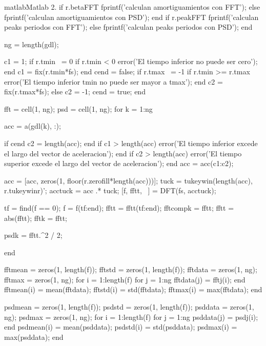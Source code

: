 \begin{sourcecode}{matlab}{Matlab 2.}
if r.betaFFT
    fprintf('\tSe calculan amortiguamientos con FFT\n');
else
    fprintf('\tSe calculan amortiguamientos con PSD\n');
end
if r.peakFFT
    fprintf('\tSe calculan peaks periodos con FFT\n');
else
    fprintf('\tSe calculan peaks periodos con PSD\n');
end

ng = length(gdl);

c1 = 1;
if r.tmin ~= 0
    if r.tmin < 0
        error('El tiempo inferior no puede ser cero');
    end
    c1 = fix(r.tmin*fs);
end
cend = false;
if r.tmax ~= -1
    if r.tmin >= r.tmax
        error('El tiempo inferior tmin no puede ser mayor a tmax');
    end
    c2 = fix(r.tmax*fs);
else
    c2 = -1;
    cend = true;
end

fft = cell(1, ng);
psd = cell(1, ng);
for k = 1:ng
    
    acc = a(gdl(k), :);
    
    if cend
        c2 = length(acc);
    end
    if c1 > length(acc)
        error('El tiempo inferior excede el largo del vector de aceleracion');
    end
    if c2 > length(acc)
        error('El tiempo superior excede el largo del vector de aceleracion');
    end
    acc = acc(c1:c2);
    
    acc = [acc, zeros(1, floor(r.zerofill*length(acc)))]; %
    tuck = tukeywin(length(acc), r.tukeywinr)';
    acctuck = acc .* tuck;
    [f, fftt, ~] = DFT(fs, acctuck);
    
    tf = find(f == 0);
    f = f(tf:end);
    fftt = fftt(tf:end);
    fftcomp{k} = fftt; %
    fftt = abs(fftt); %
    fft{k} = fftt; %
    
    psd{k} = fftt.^2 / 2;
    
end %

fftmean = zeros(1, length(f));
fftstd = zeros(1, length(f));
fftdata = zeros(1, ng);
fftmax = zeros(1, ng);
for i = 1:length(f)
    for j = 1:ng %
        fftdata(j) = fft{j}(i);
    end %
    fftmean(i) = mean(fftdata);
    fftstd(i) = std(fftdata);
    fftmax(i) = max(fftdata);
end %

psdmean = zeros(1, length(f));
psdstd = zeros(1, length(f));
psddata = zeros(1, ng);
psdmax = zeros(1, ng);
for i = 1:length(f)
    for j = 1:ng %
        psddata(j) = psd{j}(i);
    end %
    psdmean(i) = mean(psddata);
    psdstd(i) = std(psddata);
    psdmax(i) = max(psddata);
end %


\end{sourcecode}
